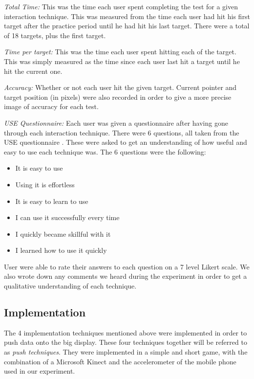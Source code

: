 \textit{Total Time:} This was the time each user spent completing the test for a given interaction technique.  This was measured from the time each user had hit his first target after the practice period until he had hit his last target. There were a total of 18 targets, plus the first target. 

\textit{Time per target:} This was the time each user spent hitting each of the target. This was simply measured as the time since each user last hit a target until he hit the current one.

\textit{Accuracy:} Whether or not each user hit the given target. Current pointer and target position (in pixels) were also recorded in order to give a more precise image of accuracy for each test. 

\textit{USE Questionnaire:} Each user was given a questionnaire after having gone through each interaction technique. There were 6 questions, all taken from the USE questionnaire . These were asked to get an understanding of how useful and easy to use each technique was. The 6 questions were the following: 


\begin{itemize}
	\item It is easy to use
	\item Using it is effortless
	\item It is easy to learn to use
	\item I can use it successfully every time
	\item I quickly became skillful with it
	\item I learned how to use it quickly
\end{itemize}

User were able to rate their answers to each question on a 7 level Likert scale. We also wrote down any comments we heard during the experiment in order to get a qualitative understanding of each technique.  

\subsection{Implementation}

The 4 implementation techniques mentioned above were implemented in order to push data onto the big display. These four techniques together will be referred to as \textit{push techniques}. They were implemented in a simple and short game, with the combination of a Microsoft Kinect and the accelerometer of the mobile phone used in our experiment. 

